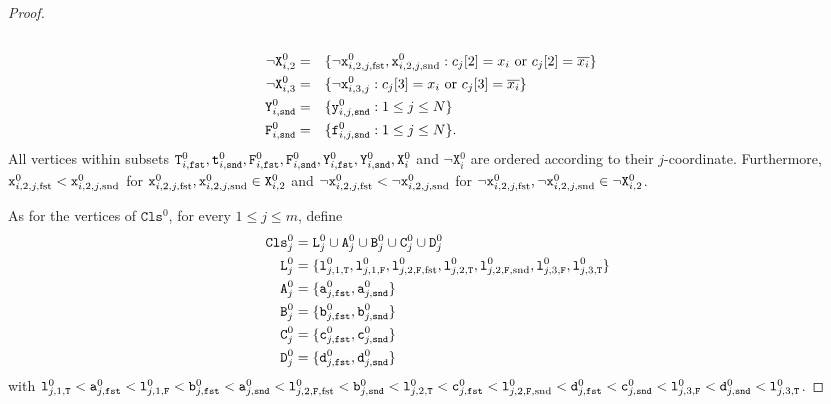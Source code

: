 \begin{proof}
\begin{alignat*}{2}
      \\
      \neg\texttt{X}^{0}_{i,2}
      &=
      &&\{\neg\texttt{x}^{0}_{i,2,j,\text{fst}}, \texttt{x}^{0}_{i,2,j,\text{snd}} :
      \text{$c_{j}[2] = x_{i}$ or $c_{j}[2] = \overline{x_{i}}$}\}
      \\
      \neg\texttt{X}^{0}_{i,3}
      &=
      &&\{\neg\texttt{x}^{0}_{i,3,j} :
      \text{$c_{j}[3] = x_{i}$ or $c_{j}[3] = \overline{x_{i}}$}\}
      \\
      \texttt{Y}^{0}_{i,\texttt{snd}}
      &=
      &&\{\texttt{y}^{0}_{i,j,\texttt{snd}} : 1 \leq j \leq N\}
      \\
      \texttt{F}^{0}_{i,\texttt{snd}}
      &=
      &&\{\texttt{f}^{0}_{i,j,\texttt{snd}} : 1 \leq j \leq N\}\text{.}
    \end{alignat*}
    All vertices within subsets
    $\texttt{T}^{0}_{i,\texttt{fst}}, \texttt{t}^{0}_{i,\texttt{snd}},
    \texttt{F}^{0}_{i,\texttt{fst}}, \texttt{F}^{0}_{i,\texttt{snd}},
    \texttt{Y}^{0}_{i,\texttt{fst}}, \texttt{Y}^{0}_{i,\texttt{snd}},
    \texttt{X}^{0}_{i}$ and $\neg\texttt{X}^{0}_{i}$
    are ordered according to their $j$-coordinate.
    Furthermore,
    $\texttt{x}^{0}_{i,2,j,\text{fst}} < \texttt{x}^{0}_{i,2,j,\text{snd}}$
    for $\texttt{x}^{0}_{i,2,j,\text{fst}}, \texttt{x}^{0}_{i,2,j,\text{snd}} \in \texttt{X}^{0}_{i,2}$
    and
    $\neg\texttt{x}^{0}_{i,2,j,\text{fst}} < \neg\texttt{x}^{0}_{i,2,j,\text{snd}}$
    for $\neg\texttt{x}^{0}_{i,2,j,\text{fst}}, \neg\texttt{x}^{0}_{i,2,j,\text{snd}} \in \neg\texttt{X}^{0}_{i,2}$.

    As for the vertices of $\texttt{Cls}^{0}$, for every $1 \leq j \leq m$, define
    \begin{align*}
      \texttt{Cls}^{0}_{j} &=
      \texttt{L}^{0}_{j} \cup
      \texttt{A}^{0}_{j} \cup
      \texttt{B}^{0}_{j} \cup
      \texttt{C}^{0}_{j} \cup
      \texttt{D}^{0}_{j}
      \\
      \texttt{L}^{0}_{j} &= \{
      \texttt{l}^{0}_{j,1,\texttt{T}},
      \texttt{l}^{0}_{j,1,\texttt{F}},
      \texttt{l}^{0}_{j,2,\texttt{F},\text{fst}},
      \texttt{l}^{0}_{j,2,\texttt{T}},
      \texttt{l}^{0}_{j,2,\texttt{F},\text{snd}},
      \texttt{l}^{0}_{j,3,\texttt{F}},
      \texttt{l}^{0}_{j,3,\texttt{T}}
      \}
      \\
      \texttt{A}^{0}_{j} &= \{\texttt{a}^{0}_{j,\texttt{fst}}, \texttt{a}^{0}_{j,\texttt{snd}}\}
      \\
      \texttt{B}^{0}_{j} &= \{\texttt{b}^{0}_{j,\texttt{fst}}, \texttt{b}^{0}_{j,\texttt{snd}}\}
      \\
      \texttt{C}^{0}_{j} &= \{\texttt{c}^{0}_{j,\texttt{fst}}, \texttt{c}^{0}_{j,\texttt{snd}}\}
      \\
      \texttt{D}^{0}_{j} &= \{\texttt{d}^{0}_{j,\texttt{fst}}, \texttt{d}^{0}_{j,\texttt{snd}}\}
    \end{align*}
    with
    $
    \texttt{l}^{0}_{j,1,\texttt{T}} <
    \texttt{a}^{0}_{j,\texttt{fst}} <
    \texttt{l}^{0}_{j,1,\texttt{F}} <
    \texttt{b}^{0}_{j,\texttt{fst}} <
    \texttt{a}^{0}_{j,\texttt{snd}} <
    \texttt{l}^{0}_{j,2,\texttt{F},\text{fst}} <
    \texttt{b}^{0}_{j,\texttt{snd}} <
    \texttt{l}^{0}_{j,2,\texttt{T}} <
    \texttt{c}^{0}_{j,\texttt{fst}} <
    \texttt{l}^{0}_{j,2,\texttt{F},\text{snd}} <
    \texttt{d}^{0}_{j,\texttt{fst}} <
    \texttt{c}^{0}_{j,\texttt{snd}} <
    \texttt{l}^{0}_{j,3,\texttt{F}} <
    \texttt{d}^{0}_{j,\texttt{snd}} <
    \texttt{l}^{0}_{j,3,\texttt{T}}
    $.


\end{proof}
